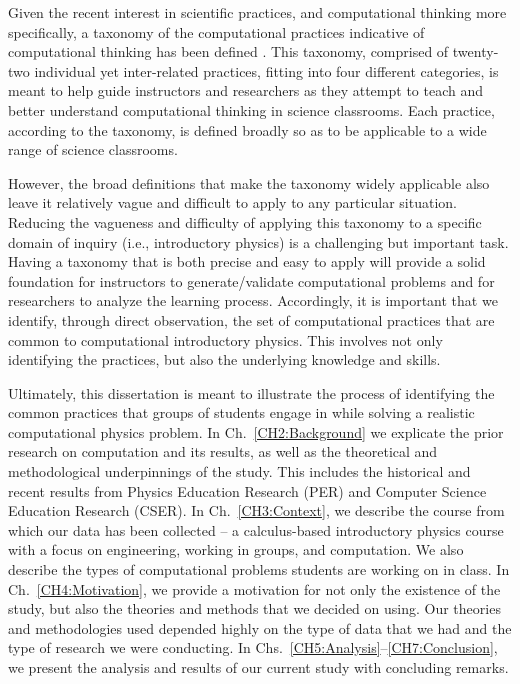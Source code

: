 \documentclass{msuphddissertation}
\begin{document}
\begin{doublespace}
Given the recent interest in scientific practices, and computational thinking more specifically, a taxonomy of the computational practices indicative of computational thinking has been defined \cite{Weintrop2015}.  This taxonomy, comprised of twenty-two individual yet inter-related practices, fitting into four different categories, is meant to help guide instructors and researchers as they attempt to teach and better understand computational thinking in science classrooms.  Each practice, according to the taxonomy, is defined broadly so as to be applicable to a wide range of science classrooms.

However, the broad definitions that make the taxonomy widely applicable also leave it relatively vague and difficult to apply to any particular situation.  Reducing the vagueness and difficulty of applying this taxonomy to a specific domain of inquiry (i.e., introductory physics) is a challenging but important task.  Having a taxonomy that is both precise and easy to apply will provide a solid foundation for instructors to generate/validate computational problems and for researchers to analyze the learning process.  Accordingly, it is important that we identify, through direct observation, the set of computational practices that are common to computational introductory physics.  This involves not only identifying the practices, but also the underlying knowledge and skills.

Ultimately, this dissertation is meant to illustrate the process of identifying the common practices that groups of students engage in while solving a realistic computational physics problem.  In Ch.~\ref{CH2:Background} we explicate the prior research on computation and its results, as well as the theoretical and methodological underpinnings of the study.  This includes the historical and recent results from Physics Education Research (PER) and Computer Science Education Research (CSER).  In Ch.~\ref{CH3:Context}, we describe the course from which our data has been collected -- a calculus-based introductory physics course with a focus on engineering, working in groups, and computation.  We also describe the types of computational problems students are working on in class.  In Ch.~\ref{CH4:Motivation}, we provide a motivation for not only the existence of the study, but also the theories and methods that we decided on using.  Our theories and methodologies used depended highly on the type of data that we had and the type of research we were conducting.  In Chs.~\ref{CH5:Analysis}--\ref{CH7:Conclusion}, we present the analysis and results of our current study with concluding remarks.


\end{doublespace}
\end{document}
